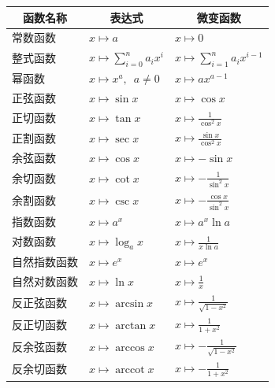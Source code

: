 \documentclass[12pt,UTF8]{ctexbook}
\newcommand{\arccot}{\operatorname{arccot}}
\theoremstyle{definition}
\theoremstyle{plain}
\begin{document}
\begin{appendix}
\begin{center}
    \renewcommand{\arraystretch}{2}
    \setlength{\extrarowheight}{-3pt}
    \begin{longtable}{|l|l|l|}
        \hline \multicolumn{1}{|c|}{\textbf{函数名称}} & \multicolumn{1}{c|}{\textbf{表达式}} & \multicolumn{1}{c|}{\textbf{微变函数}} \\ 
        \hline         
        常数函数 & $x\mapsto a$ & $x\mapsto 0$ \\  
        \hline
        整式函数 & $x\mapsto \sum_{i=0}^n a_i x^i$ & $x\mapsto \sum_{i=1}^n a_i x^{i-1}$ \\ 
        \hline
        幂函数 & $x\mapsto x^a, \,\,\, a\neq 0$ & $x\mapsto ax^{a-1}$ \\ 
        \hline
        正弦函数 & $x\mapsto \sin{x}$ & $x\mapsto \cos{x}$ \\ 
        \hline
        正切函数 & $x\mapsto \tan{x}$ & $x\mapsto \frac{1}{\cos^2{x}}$ \\
        \hline
        正割函数 & $x\mapsto \sec{x}$ & $x\mapsto \frac{\sin{x}}{\cos^2{x}}$ \\ 
        \hline
        余弦函数 & $x\mapsto \cos{x}$ & $x\mapsto -\sin{x}$ \\ 
        \hline
        余切函数 & $x\mapsto \cot{x}$ & $x\mapsto -\frac{1}{\sin^2{x}}$ \\ 
        \hline
        余割函数 & $x\mapsto \csc{x}$ & $x\mapsto -\frac{\cos{x}}{\sin^2{x}}$ \\
        \hline
        指数函数 & $x\mapsto a^x$ & $x\mapsto a^x \ln{a} $ \\ 
        \hline
        对数函数 & $x\mapsto \log_a{x}$ & $x\mapsto \frac{1}{x\ln{a}} $ \\
        \hline
        自然指数函数 & $x\mapsto e^x$ & $x\mapsto e^x $ \\ 
        \hline
        自然对数函数 & $x\mapsto \ln{x}$ & $x\mapsto \frac{1}{x} $ \\  
        \hline
        反正弦函数 & $x\mapsto \arcsin{x}$ & $x\mapsto \frac{1}{\sqrt{1 - x^2}}$ \\ 
        \hline
        反正切函数 & $x\mapsto \arctan{x}$ & $x\mapsto \frac{1}{1 + x^2}$ \\
        \hline
        反余弦函数 & $x\mapsto \arccos{x}$ & $x\mapsto -\frac{1}{\sqrt{1 - x^2}}$ \\ 
        \hline
        反余切函数 & $x\mapsto \arccot{x}$ & $x\mapsto -\frac{1}{1 + x^2}$ \\ 
        \hline
    \end{longtable}
\end{center}


\end{appendix}
\end{document}
